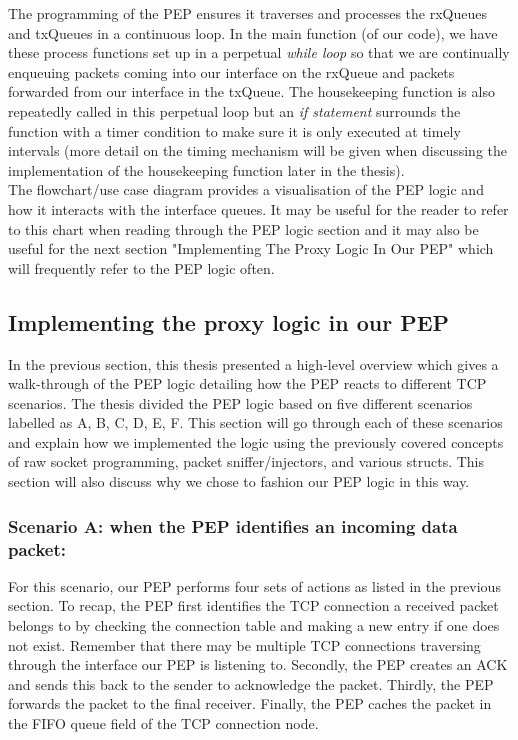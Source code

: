 \documentclass{uathesis}
\begin{document}
The programming of the PEP  ensures it traverses and processes the rxQueues and txQueues in a continuous loop. In the main function (of our code), we have these process functions set up in a perpetual \emph{while loop} so that we are continually enqueuing packets coming into our interface on the rxQueue and packets forwarded from our interface in the txQueue. The housekeeping function is also repeatedly called in this perpetual loop but an \emph{if statement} surrounds the function with a timer condition to make sure it is only executed at timely intervals (more detail on the timing mechanism will be given when discussing the implementation of the housekeeping function later in the thesis).\\

The flowchart/use case diagram provides a visualisation of the PEP logic and how it interacts with the interface queues. It may be useful for the reader to refer to this chart when reading through the PEP logic section and it may also be useful for the next section "Implementing The Proxy Logic In Our PEP" which will frequently refer to the PEP logic often. 

\subsection{Implementing the proxy logic in our PEP}
In the previous section, this thesis presented a high-level overview which gives a walk-through of the PEP logic detailing how the PEP reacts to different TCP scenarios.  The thesis divided the PEP logic based on five different scenarios labelled as A, B, C, D, E, F. This section will go through each of these scenarios and explain how we implemented the logic using the previously covered concepts of raw socket programming, packet sniffer/injectors, and various structs.  This section will also discuss why we chose to fashion our PEP logic in this way.  \\

\subsubsection{Scenario A: when the PEP identifies an incoming data packet:}
For this scenario, our PEP performs four sets of actions as listed in the previous section. To recap, the PEP first identifies the TCP connection a received packet belongs to by checking the connection table and making a new entry if one does not exist. Remember that there may be multiple TCP connections traversing through the interface our PEP is listening to. Secondly, the PEP creates an ACK and sends this back to the sender to acknowledge the packet. Thirdly, the PEP forwards the packet to the final receiver. Finally, the PEP caches the packet in the FIFO queue field of the TCP connection node.  \\
\end{document}
